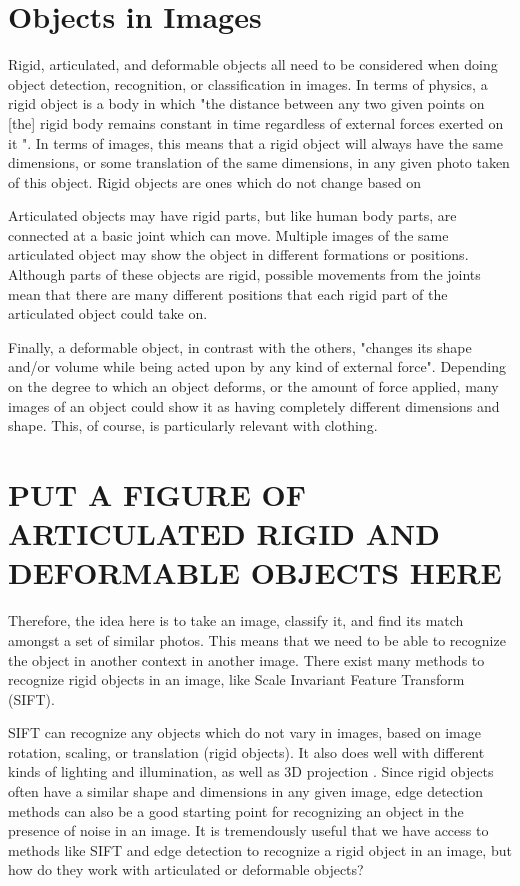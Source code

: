 \documentclass[12pt]{article} %
\begin{document}
\section{Objects in Images}

	Rigid, articulated, and deformable objects all need to be considered when doing object detection, recognition, or classification in images. In terms of physics, a rigid object is a body in which "the distance between any two given points on [the] rigid body remains constant in time regardless of external forces exerted on it "\cite{RigidBodyWiki}. In terms of images, this means that a rigid object will always have the same dimensions, or some translation of the same dimensions, in any given photo taken of this object. Rigid objects are ones which do not change based on 

Articulated objects may have rigid parts, but like human body parts, are connected at a basic joint which can move\cite{szeliski2010computer}. Multiple images of the same articulated object may show the object in different formations or positions. Although parts of these objects are rigid, possible movements from the joints mean that there are many different positions that each rigid part of the articulated object could take on. 

Finally, a deformable object, in contrast with the others, "changes its shape and/or volume while being acted upon by any kind of external force"\cite{wolfram}. Depending on the degree to which an object deforms, or the amount of force applied, many images of an object could show it as having completely different dimensions and shape. This, of course, is particularly relevant with clothing. 
	
\section{PUT A FIGURE OF ARTICULATED RIGID AND DEFORMABLE OBJECTS HERE}
	
	Therefore, the idea here is to take an image, classify it, and find its match amongst a set of similar photos. This means that we need to be able to recognize the object in another context in another image. There exist many methods to recognize rigid objects in an image, like Scale Invariant Feature Transform (SIFT). 

SIFT can recognize any objects which do not vary in images, based on image rotation, scaling, or translation (rigid objects). It also does well with different kinds of lighting and illumination, as well as 3D projection \cite{lowe1999object}. Since rigid objects often have a similar shape and dimensions in any given image, edge detection methods can also be a good starting point for recognizing an object in the presence of noise in an image. It is tremendously useful that we have access to methods like SIFT and edge detection to recognize a rigid object in an image, but how do they work with articulated or deformable objects? 
\end{document}
